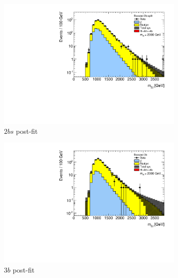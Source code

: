 \begin{figure}[htbp!]
\centering
\captionsetup{justification=centering}
    \vspace{-1cm}
    \begin{subfigure}[b]{0.25\textwidth}
        \includegraphics[width=\textwidth,angle=-90]{figures/boosted/results/postfitplot_s_2000_b2b.pdf}
        \caption{$2bs$ post-fit}
        \label{fig:postfit2bs}
    \end{subfigure}
    \quad \quad \quad
    \begin{subfigure}[b]{0.25\textwidth}
        \includegraphics[width=\textwidth,angle=-90]{figures/boosted/results/postfitplot_s_2000_b3b.pdf}
        \caption{$3b$ post-fit}
        \label{fig:postfit3b}
    \end{subfigure}
    \quad \quad \quad
    \begin{subfigure}[b]{0.25\textwidth}

\end{subfigure}
\end{figure}
